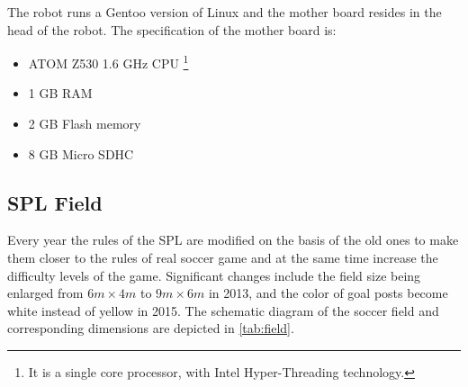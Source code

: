 The robot runs a Gentoo version of Linux and the mother board resides in the head of the robot. The specification of the mother board is:
\begin{itemize}
  \item ATOM Z530 1.6 GHz CPU \footnote{It is a single core processor, with Intel Hyper-Threading technology.}
  \item 1 GB RAM
  \item 2 GB Flash memory
\item 8 GB Micro SDHC
\end{itemize}

\subsection[Standard Platform League Field]{\gls{SPL} Field}
Every year the rules of the \gls{SPL} are modified on the basis of the old ones to make them closer to the rules of real soccer game and at the same time increase the difficulty levels of the game. Significant changes include the field size being enlarged from $6m \times 4m$ to $9m \times 6m$ in 2013, and the color of goal posts become white instead of yellow in 2015. The schematic diagram of the soccer field and corresponding dimensions are depicted in \autoref{tab:field}.

